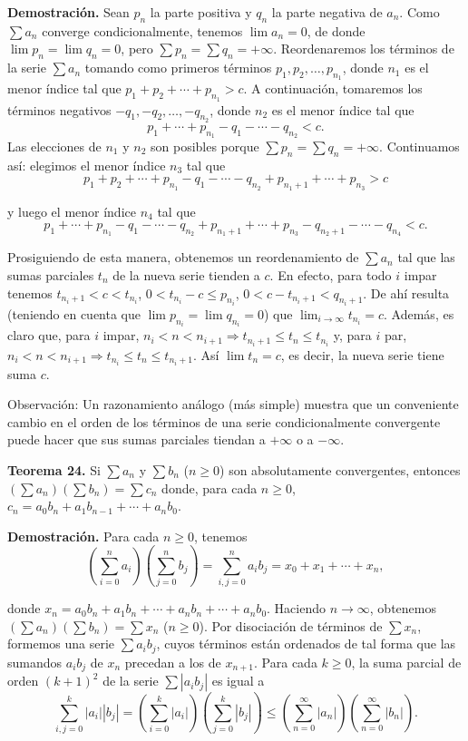 \documentclass[12pt,oneside]{book}
\begin{document}
\textbf{Demostración.} Sean \(p_n\) la parte positiva y \(q_n\) la parte negativa de \(a_n\). Como \(\sum a_n\) converge condicionalmente, tenemos \(\lim a_n = 0\), de donde \(\lim p_n = \lim q_n = 0\), pero \(\sum p_n = \sum q_n = +\infty\). Reordenaremos los términos de la serie \(\sum a_n\) tomando como primeros términos \(p_1, p_2, \ldots, p_{n_1}\), donde \(n_1\) es el menor índice tal que \(p_1 + p_2 + \cdots + p_{n_1} > c.\) A continuación, tomaremos los términos negativos \(-q_1, -q_2, \dots, -q_{n_2}\), donde \(n_2\) es el menor índice tal que  
\[p_1 + \cdots + p_{n_1} - q_1 - \cdots - q_{n_2} < c.\]  
Las elecciones de \(n_1\) y \(n_2\) son posibles porque \(\sum p_n = \sum q_n = +\infty\). Continuamos así: elegimos el menor índice \(n_3\) tal que  
\[p_1 + p_2 + \cdots + p_{n_1} - q_1 - \cdots - q_{n_2} + p_{n_1+1} + \cdots + p_{n_3} > c\]  

y luego el menor índice \(n_4\) tal que  
\[p_1 + \cdots + p_{n_1} - q_1 - \cdots - q_{n_2} + p_{n_1+1} + \cdots + p_{n_3} - q_{n_2+1} - \cdots - q_{n_4} < c.\]  

Prosiguiendo de esta manera, obtenemos un reordenamiento de \(\sum a_n\) tal que las sumas parciales \(t_n\) de la nueva serie tienden a \(c\). En efecto, para todo \(i\) impar tenemos \(t_{n_i+1} < c < t_{n_i}\), \(0 < t_{n_i} - c \le p_{n_i}\), \(0 < c - t_{n_i+1} < q_{n_i+1}\). De ahí resulta (teniendo en cuenta que \(\lim p_{n_i} = \lim q_{n_i} = 0\)) que \(\lim_{i \to \infty} t_{n_i} = c\). Además, es claro que, para \(i\) impar, \(n_i < n < n_{i+1} \Rightarrow t_{n_i+1} \le t_n \le t_{n_i}\) y, para \(i\) par, \(n_i < n < n_{i+1} \Rightarrow t_{n_i} \le t_n \le t_{n_i+1}\). Así \(\lim t_n = c\), es decir, la nueva serie tiene suma \(c\).

Observación: Un razonamiento análogo (más simple) muestra que un conveniente cambio en el orden de los términos de una serie condicionalmente convergente puede hacer que sus sumas parciales tiendan a \(+\infty\) o a \(-\infty\).

\textbf{Teorema 24.} Si \(\sum a_n\) y \(\sum b_n\) (\(n \ge 0\)) son absolutamente convergentes, entonces \((\sum a_n)(\sum b_n) = \sum c_n\) donde, para cada \(n \ge 0\), \(c_n = a_0 b_n + a_1 b_{n-1} + \cdots + a_n b_0\).

\textbf{Demostración.} Para cada \(n \ge 0\), tenemos  
\[
\left( \sum_{i=0}^{n} a_i \right) \left( \sum_{j=0}^{n} b_j \right) = \sum_{i,j=0}^{n} a_i b_j = x_0 + x_1 + \cdots + x_n,
\]  

donde \(x_n = a_0 b_n + a_1 b_n + \cdots + a_n b_n + \cdots + a_n b_0\). Haciendo \(n \to \infty\), obtenemos \((\sum a_n)(\sum b_n) = \sum x_n\) (\(n \ge 0\)). Por disociación de términos de \(\sum x_n\), formemos una serie \(\sum a_i b_j\), cuyos términos están ordenados de tal forma que las sumandos \(a_i b_j\) de \(x_n\) precedan a los de \(x_{n+1}\). Para cada \(k \ge 0\), la suma parcial de orden \((k+1)^2\) de la serie \(\sum |a_i b_j|\) es igual a
\[
\sum_{i,j=0}^{k} |a_i||b_j| = \left( \sum_{i=0}^{k} |a_i| \right) \left( \sum_{j=0}^{k} |b_j| \right) \leq \left( \sum_{n=0}^{\infty} |a_n| \right) \left( \sum_{n=0}^{\infty} |b_n| \right).
\]
\end{document}

